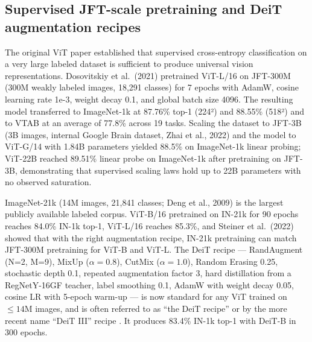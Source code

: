 \documentclass{article}
\begin{document}
\subsection{Supervised JFT-scale pretraining and DeiT augmentation recipes}\label{supervised-jft-scale-pretraining-and-deit-augmentation-recipes}

The original ViT paper established that supervised cross-entropy classification on a very large labeled dataset is sufficient to produce universal vision representations. Dosovitskiy et al.~(2021) pretrained ViT-L/16 on JFT-300M (300M weakly labeled images, 18,291 classes) for 7 epochs with AdamW, cosine learning rate 1e-3, weight decay 0.1, and global batch size 4096. The resulting model transferred to ImageNet-1k at 87.76\% top-1 (224²) and 88.55\% (518²) and to VTAB at an average of 77.8\% across 19 tasks. Scaling the dataset to JFT-3B (3B images, internal Google Brain dataset, Zhai et al., 2022) and the model to ViT-G/14 with 1.84B parameters yielded 88.5\% on ImageNet-1k linear probing; ViT-22B \citep{dehghani2023scalingvisiontrans} reached 89.51\% linear probe on ImageNet-1k after pretraining on JFT-3B, demonstrating that supervised scaling laws hold up to 22B parameters with no observed saturation.

ImageNet-21k (14M images, 21,841 classes; Deng et al., 2009) is the largest publicly available labeled corpus. ViT-B/16 pretrained on IN-21k for 90 epochs reaches 84.0\% IN-1k top-1, ViT-L/16 reaches 85.3\%, and Steiner et al.~(2022) showed that with the right augmentation recipe, IN-21k pretraining can match JFT-300M pretraining for ViT-B and ViT-L. The DeiT recipe --- RandAugment (N=2, M=9), MixUp (\(\alpha = 0.8\)), CutMix (\(\alpha = 1.0\)), Random Erasing 0.25, stochastic depth 0.1, repeated augmentation factor 3, hard distillation from a RegNetY-16GF teacher, label smoothing 0.1, AdamW with weight decay 0.05, cosine LR with 5-epoch warm-up --- is now standard for any ViT trained on \(\le 14\)M images, and is often referred to as ``the DeiT recipe'' or by the more recent name ``DeiT III'' recipe \citep{touvron2022resmlpfeedforwardn}. It produces 83.4\% IN-1k top-1 with DeiT-B in 300 epochs.
\end{document}
